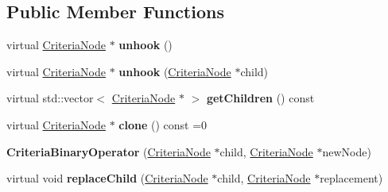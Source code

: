 \subsection*{Public Member Functions}
\begin{DoxyCompactItemize}
\item 
virtual \hyperlink{classCriteriaNode}{Criteria\+Node} $\ast$ {\bfseries unhook} ()\hypertarget{classCriteriaBinaryOperator_a6983ccb02e9d05c84fe091f3857633e5}{}\label{classCriteriaBinaryOperator_a6983ccb02e9d05c84fe091f3857633e5}

\item 
virtual \hyperlink{classCriteriaNode}{Criteria\+Node} $\ast$ {\bfseries unhook} (\hyperlink{classCriteriaNode}{Criteria\+Node} $\ast$child)\hypertarget{classCriteriaBinaryOperator_acc2b1cfee79de429a43a0d8d1262e7cb}{}\label{classCriteriaBinaryOperator_acc2b1cfee79de429a43a0d8d1262e7cb}

\item 
virtual std\+::vector$<$ \hyperlink{classCriteriaNode}{Criteria\+Node} $\ast$ $>$ {\bfseries get\+Children} () const \hypertarget{classCriteriaBinaryOperator_a3a3e572aec19a36498a70e089f61dddc}{}\label{classCriteriaBinaryOperator_a3a3e572aec19a36498a70e089f61dddc}

\item 
virtual \hyperlink{classCriteriaNode}{Criteria\+Node} $\ast$ {\bfseries clone} () const =0\hypertarget{classCriteriaBinaryOperator_a206b4d159517178f71d7a1c0858d4cf6}{}\label{classCriteriaBinaryOperator_a206b4d159517178f71d7a1c0858d4cf6}

\item 
{\bfseries Criteria\+Binary\+Operator} (\hyperlink{classCriteriaNode}{Criteria\+Node} $\ast$child, \hyperlink{classCriteriaNode}{Criteria\+Node} $\ast$new\+Node)\hypertarget{classCriteriaBinaryOperator_a2a8521a46600be2d25ccdbc1237d8074}{}\label{classCriteriaBinaryOperator_a2a8521a46600be2d25ccdbc1237d8074}

\item 
virtual void {\bfseries replace\+Child} (\hyperlink{classCriteriaNode}{Criteria\+Node} $\ast$child, \hyperlink{classCriteriaNode}{Criteria\+Node} $\ast$replacement)\hypertarget{classCriteriaBinaryOperator_a103e2c307152802dfbdd307e84891198}{}\label{classCriteriaBinaryOperator_a103e2c307152802dfbdd307e84891198}

\end{DoxyCompactItemize}

